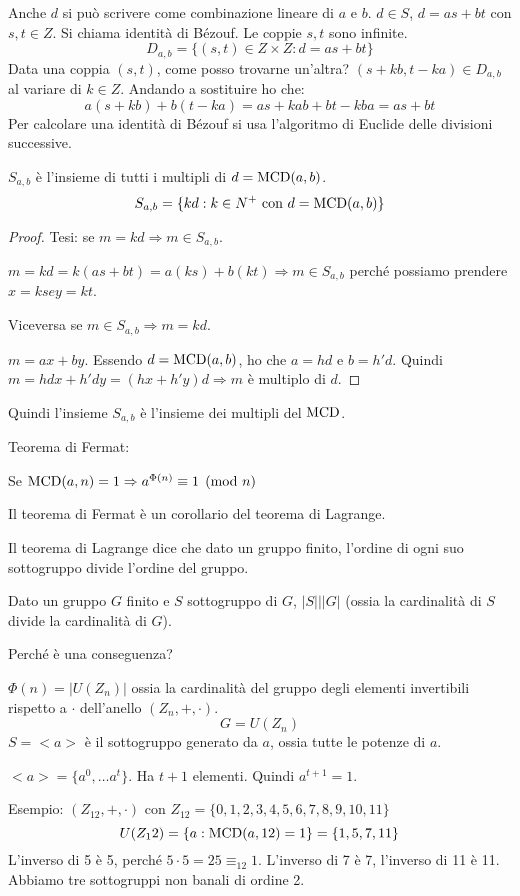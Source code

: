 Anche $d$ si pu\`o scrivere come combinazione lineare di $a$ e $b$. $d \in S$, $d = a s + b t$ con $s, t \in Z$. Si chiama identit\`a di B\'ezouf. Le coppie $s,t$ sono infinite.
\[
D_{a,b} = \{ (s, t) \in Z \times Z : d = a s + b t \}
\]
Data una coppia $(s,t)$, come posso trovarne un'altra? $(s + k b, t - k a) \in D_{a,b}$ al variare di $k \in Z$. Andando a sostituire ho che:
\[
a (s + kb) + b(t - ka) = as + kab + bt -kba = as + bt
\]
Per calcolare una identit\`a di B\'ezouf si usa l'algoritmo di Euclide delle divisioni successive.

\begin{prop}
$S_{a,b}$ \`e l'insieme di tutti i multipli di $d = \operatorname{MCD}(a,b)$.
\[
S_{a,b} = \{ k d : k \in N^+ \text{ con } d = \operatorname{MCD}(a,b) \}
\]
\end{prop}
\begin{proof}
Tesi: se $m = kd \Rightarrow m \in S_{a,b}$.

$m = k d = k (as + bt) = a (ks) + b (kt) \Rightarrow m \in S_{a,b}$ perch\'e possiamo prendere $x = ks e y = kt$.

Viceversa se $m \in S_{a,b} \Rightarrow m = kd$.

$m = ax + by$. Essendo $d = \operatorname{MCD}(a,b)$, ho che $a = hd$ e $b = h' d$. Quindi $m = hdx + h'dy = (hx + h'y) d \Rightarrow m$ \`e multiplo di $d$.
\end{proof}
Quindi l'insieme $S_{a,b}$ \`e l'insieme dei multipli del $\operatorname{MCD}$.

Teorema di Fermat:

Se $\operatorname{MCD}(a, n) = 1 \Rightarrow a^{\Phi(n)} \equiv 1 \pmod n$

Il teorema di Fermat \`e un corollario del teorema di Lagrange.

Il teorema di Lagrange dice che dato un gruppo finito, l'ordine di ogni suo sottogruppo divide l'ordine del gruppo.

Dato un gruppo $G$ finito e $S$ sottogruppo di $G$, $|S| \Big| |G|$ (ossia la cardinalit\`a di $S$ divide la cardinalit\`a di $G$).

Perch\'e \`e una conseguenza? 

$\Phi(n) = | U(Z_n) |$ ossia la cardinalit\`a del gruppo degli elementi invertibili rispetto a $\cdot$ dell'anello $(Z_n, +, \cdot)$.
\[
G = U(Z_n)
\]
$S = < a >$ \`e il sottogruppo generato da $a$, ossia tutte le potenze di $a$.

$< a > = \{ a^0, \dots a^t \}$. Ha $t + 1$ elementi. Quindi $a^{t+1} = 1$.

Esempio:
$(Z_12, +, \cdot)$ con $Z_12 = \{0,1,2,3,4,5,6,7,8,9,10,11\}$
\[
U(Z_12) = \{ a : \operatorname{MCD}(a, 12) = 1\} = \{ 1, 5, 7, 11 \}
\]
L'inverso di 5 \`e 5, perch\'e $5 \cdot 5 = 25 \equiv_{12} 1$. L'inverso di 7 \`e 7, l'inverso di 11 \`e 11. Abbiamo tre sottogruppi non banali di ordine 2.

